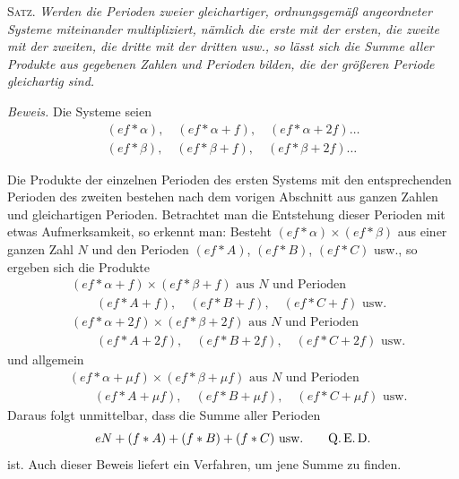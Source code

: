 \textsc{Satz.} \emph{Werden die Perioden zweier gleichartiger, ordnungsgemäß angeordneter Systeme miteinander multipliziert, nämlich die erste mit der ersten, die zweite mit der zweiten, die dritte mit der dritten usw., so lässt sich die Summe aller Produkte aus gegebenen Zahlen und Perioden bilden, die der größeren Periode gleichartig sind.}

\emph{Beweis.} Die Systeme seien
\[
\begin{gathered}
(ef\ast\alpha),\quad(ef\ast\alpha+f),\quad(ef\ast\alpha+2f)\ldots\\
(ef\ast\beta),\quad(ef\ast\beta+f),\quad(ef\ast\beta+2f)\ldots
\end{gathered}
\]

Die Produkte der einzelnen Perioden des ersten Systems mit den entsprechenden Perioden des zweiten bestehen nach dem vorigen Abschnitt aus ganzen Zahlen und gleichartigen Perioden. Betrachtet man die Entstehung dieser Perioden mit etwas Aufmerksamkeit, so erkennt man: Besteht $(ef\ast\alpha)\times(ef\ast\beta)$ aus einer ganzen Zahl $N$ und den Perioden $(ef\ast A)$, $(ef\ast B)$, $(ef\ast C)$ usw., so ergeben sich die Produkte
\[
\begin{aligned}
&(ef\ast\alpha+f)\times(ef\ast\beta+f)\text{ aus }N\text{ und Perioden}\\
&\hspace{2em}(ef\ast A+f),\quad(ef\ast B+f),\quad(ef\ast C+f)\text{ usw.}\\
&(ef\ast\alpha+2f)\times(ef\ast\beta+2f)\text{ aus }N\text{ und Perioden}\\
&\hspace{2em}(ef\ast A+2f),\quad(ef\ast B+2f),\quad(ef\ast C+2f)\text{ usw.}
\end{aligned}
\]
und allgemein
\[
\begin{aligned}
&(ef\ast\alpha+\mu f)\times(ef\ast\beta+\mu f)\text{ aus }N\text{ und Perioden}\\
&\hspace{2em}(ef\ast A+\mu f),\quad(ef\ast B+\mu f),\quad(ef\ast C+\mu f)\text{ usw.}
\end{aligned}
\]
Daraus folgt unmittelbar, dass die Summe aller Perioden
\[
eN+(f\ast A)+(f\ast B)+(f\ast C)\text{ usw.}\qquad\text{Q.\,E.\,D.}
\]
ist. Auch dieser Beweis liefert ein Verfahren, um jene Summe zu finden.

